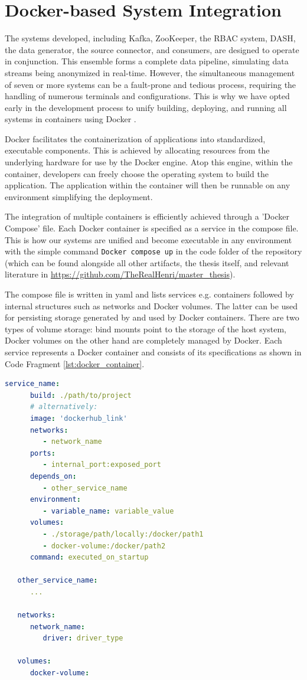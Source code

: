 \section{Docker-based System Integration}
The systems developed, including Kafka, ZooKeeper, the \ac{RBAC} system, \ac{DASH}, the data generator, the source connector, and consumers, are designed to operate in conjunction. This ensemble forms a complete data pipeline, simulating data streams being anonymized in real-time. However, the simultaneous management of seven or more systems can be a fault-prone and tedious process, requiring the handling of numerous terminals and configurations. This is why we have opted early in the development process to unify building, deploying, and running all systems in containers using Docker \cite{docker}. \par
Docker facilitates the containerization of applications into standardized, executable components. This is achieved by allocating resources from the underlying hardware for use by the Docker engine. Atop this engine, within the container, developers can freely choose the operating system to build the application. The application within the container will then be runnable on any environment simplifying the deployment. \par
The integration of multiple containers is efficiently achieved through a 'Docker Compose' file. Each Docker container is specified as a service in the compose file. This is how our systems are unified and become executable in any environment with the simple command \texttt{Docker compose up} in the code folder of the repository (which can be found alongside all other artifacts, the thesis itself, and relevant literature in \url{https://github.com/TheRealHenri/master_thesis}).\par
The compose file is written in yaml and lists services e.g. containers followed by internal structures such as networks and Docker volumes. The latter can be used for persisting storage generated by and used by Docker containers. There are two types of volume storage: bind mounts point to the storage of the host system, Docker volumes on the other hand are completely managed by Docker. 
Each service represents a Docker container and consists of its specifications as shown in Code Fragment \ref{lst:docker_container}. 

\begin{lstlisting}[language=yaml, captionpos=b, caption={General structure of a docker compose file.}, label={lst:docker_container}]
   service_name:
      build: ./path/to/project 
      # alternatively: 
      image: 'dockerhub_link'
      networks:
         - network_name
      ports: 
         - internal_port:exposed_port
      depends_on:
         - other_service_name
      environment: 
         - variable_name: variable_value
      volumes: 
         - ./storage/path/locally:/docker/path1
         - docker-volume:/docker/path2
      command: executed_on_startup
   
   other_service_name: 
      ...
   
   networks: 
      network_name: 
         driver: driver_type
   
   volumes: 
      docker-volume:
\end{lstlisting}
   
